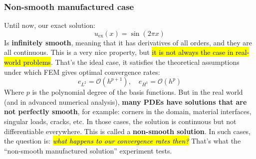 \subsubsection{Non-smooth manufactured case}

Until now, our exact solution:
\begin{equation*}
    u_{\text{ex}}(x) = \sin\left(2\pi x\right)
\end{equation*}
Is \textbf{infinitely smooth}, meaning that it has derivatives of all orders, and they are all continuous. This is a very nice property, but \hl{it is not always the case in real-world problems}. That's the ideal case, it satisfies the theoretical assumptions under which FEM gives optimal convergence rates:
\begin{equation*}
    e_{L^2} = \mathcal{O}(h^{p+1}), \quad e_{H^1} = \mathcal{O}(h^p)
\end{equation*}
Where $p$ is the polynomial degree of the basis functions. But in the real world (and in advanced numerical analysis), \textbf{many PDEs have solutions that are not perfectly smooth}, for example: corners in the domain, material interfaces, singular loads, cracks, etc. In those cases, the solution is continuous but not differentiable everywhere. This is called a \textbf{non-smooth solution}. In such cases, the question is: \hl{\emph{what happens to our convergence rates then?}} That's what the ``non-smooth manufactured solution'' experiment tests.

